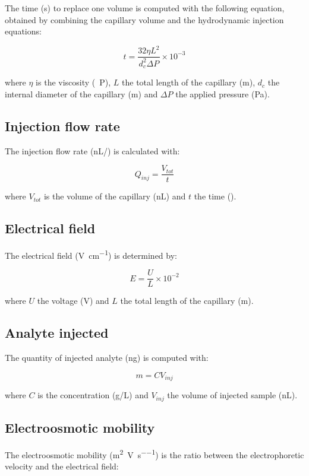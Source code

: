 \documentclass{article}
\begin{document}
The time (\si{\second}) to replace one volume is computed with the following equation, obtained by combining the capillary volume and the hydrodynamic injection equations:

\[ t = \frac{32{\eta}L^2}{d_c^2{\Delta}P} \times 10^{-3} \]

where  \(\eta\) is the viscosity (\si{{\centi}P}), \(L\) the total length of the capillary (\si{\meter}), \(d_c\) the internal diameter of the capillary (\si{\meter}) and \({\Delta}P\) the applied pressure (\si{\pascal}).


\subsection{Injection flow rate}

The injection flow rate (\si{\nano\liter/\min}) is calculated with:

\[ Q_{inj} = \frac{V_{tot}}{t} \]

where \(V_{tot}\) is the volume of the capillary (\si{\nano\liter}) and \(t\) the time (\si{\min}).


\subsection{Electrical field}

The electrical field (\si{\volt\per\centi\meter}) is determined by:

\[ E = \frac{U}{L} \times 10^{-2} \]

where  \(U\) the voltage (\si{\volt}) and \(L\) the total length of the capillary (\si{\meter}).


\subsection{Analyte injected}

The quantity of injected analyte (\si{\nano\gram}) is computed with:

\[ m = CV_{inj} \]

where \(C\) is the concentration (\si{\gram/\liter}) and \(V_{inj}\) the volume of injected sample (\si{\nano\liter}).


\subsection{Electroosmotic mobility}

The electroosmotic mobility (\si{\meter\squared\per\volt\per\second}) is the ratio between the electrophoretic velocity and the electrical field:
\end{document}
